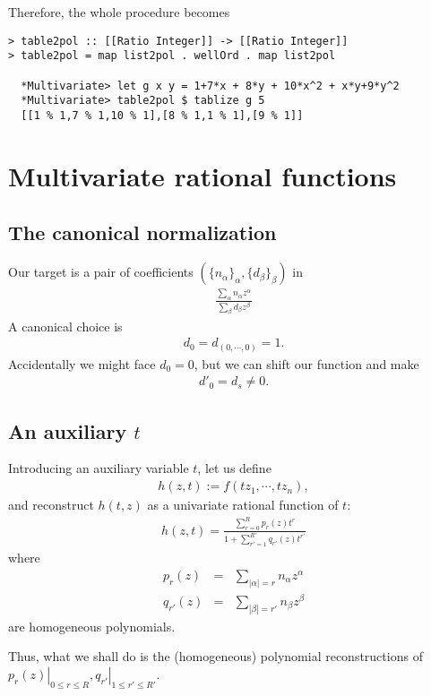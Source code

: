\documentclass[11pt]{book}
\begin{document}
Therefore, the whole procedure becomes
\begin{verbatim}  
> table2pol :: [[Ratio Integer]] -> [[Ratio Integer]]
> table2pol = map list2pol . wellOrd . map list2pol

  *Multivariate> let g x y = 1+7*x + 8*y + 10*x^2 + x*y+9*y^2
  *Multivariate> table2pol $ tablize g 5
  [[1 % 1,7 % 1,10 % 1],[8 % 1,1 % 1],[9 % 1]]
\end{verbatim}

\section{Multivariate rational functions}
\subsection{The canonical normalization}
Our target is a pair of coefficients $(\{ n_\alpha\}_\alpha, \{ d_\beta\}_\beta)$ in
\begin{eqnarray}
\frac{\sum_\alpha n_\alpha z^\alpha}{\sum_\beta d_\beta z^\beta}
\end{eqnarray}
A canonical choice is
\begin{eqnarray}
d_0 = d_{(0,\cdots,0)} = 1.
\end{eqnarray}
Accidentally we might face $d_0 = 0$, but we can shift our function and make
\begin{eqnarray}
d'_0 = d_{s} \neq 0.
\end{eqnarray}

\subsection{An auxiliary $t$}
Introducing an auxiliary variable $t$, let us define
\begin{eqnarray}
h(z,t) := f(tz_1, \cdots, tz_n),
\end{eqnarray}
and reconstruct $h(t,z)$ as a univariate rational function of $t$:
\begin{eqnarray}
h(z, t) = \frac{\sum_{r=0}^R p_r(z) t^r}{1+ \sum_{r'=1}^{R'} q_{r'}(z) t^{r'}}
\end{eqnarray}
where
\begin{eqnarray}
p_r(z) &=& \sum_{|\alpha| = r} n_\alpha z^\alpha \\
q_{r'}(z) &=& \sum_{|\beta| = r'} n_\beta z^\beta
\end{eqnarray}
are homogeneous polynomials.

Thus, what we shall do is the (homogeneous) polynomial reconstructions of $\left. p_r(z) \right|_{0 \leq r \leq R}, \left. q_{r'} \right|_{1 \leq r' \leq R'}$.
\end{document}

